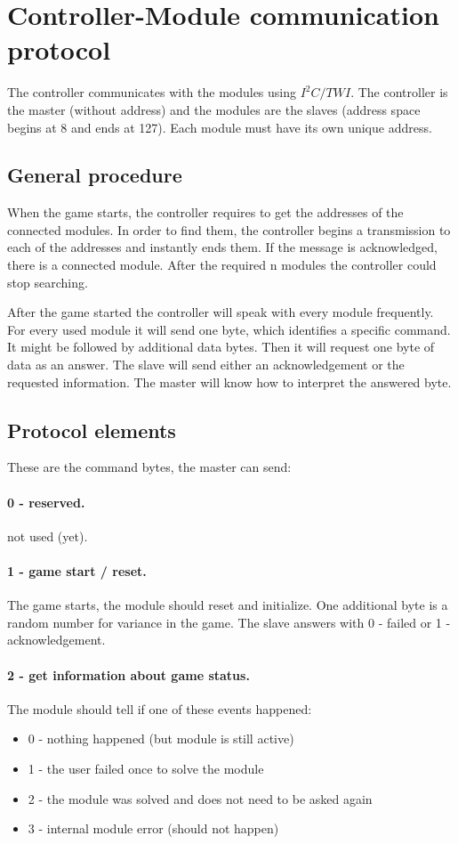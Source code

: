 \documentclass[a4paper, 12pt]{article}
\begin{document}
\section*{Controller-Module communication protocol}

The controller communicates with the modules using $I^2C/TWI$. The controller is the master (without address) and the modules are the slaves (address space begins at 8 and ends at 127). Each module must have its own unique address.

\subsection*{General procedure}

When the game starts, the controller requires to get the addresses of the connected modules. In order to find them, the controller begins a transmission to each of the addresses and instantly ends them. If the message is acknowledged, there is a connected module. After the required n modules the controller could stop searching.

After the game started the controller will speak with every module frequently. For every used module it will send one byte, which identifies a specific command. It might be followed by additional data bytes. Then it will request one byte of data as an answer. The slave will send either an acknowledgement or the requested information. The master will know how to interpret the answered byte.

\subsection*{Protocol elements}

These are the command bytes, the master can send:

\paragraph*{0 - reserved.}
not used (yet).

\paragraph*{1 - game start / reset.}
The game starts, the module should reset and initialize. One additional byte is a random number for variance in the game. The slave answers with 0 - failed or 1 - acknowledgement.

\paragraph*{2 - get information about game status.}
The module should tell if one of these events happened:
\begin{itemize}
\setlength{\itemsep}{0pt}
\item 0 - nothing happened (but module is still active)
\item 1 - the user failed once to solve the module
\item 2 - the module was solved and does not need to be asked again
\item 3 - internal module error (should not happen)
\end{itemize}
\end{document}
